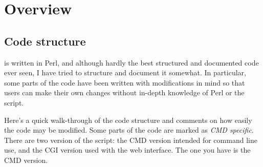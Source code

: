 \documentclass{article}
\begin{document}
\section{Overview}


\subsection{Code structure}

\TeXcount{} is written in Perl, and although hardly the best structured and documented code ever seen, I have tried to structure and document it somewhat. In particular, some parts of the code have been written with modifications in mind so that users can make their own changes without in-depth knowledge of Perl or the \TeXcount{} script.

Here's a quick walk-through of the code structure and comments on how easily the code may be modified. Some parts of the code are marked as \emph{CMD specific}. There are two version of the script: the CMD version intended for command line use, and the CGI version used with the web interface. The one you have is the CMD version.
\end{document}
